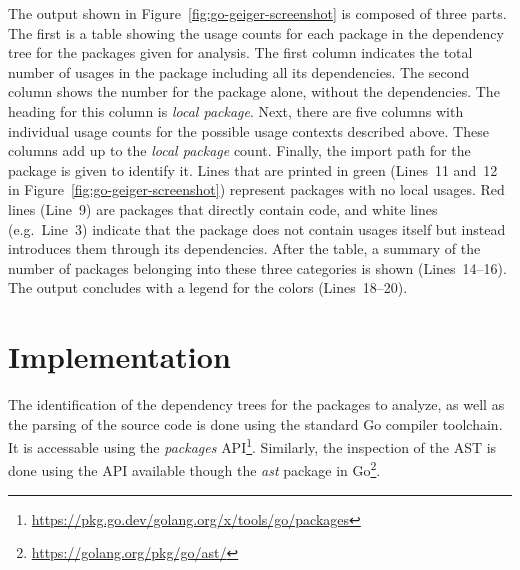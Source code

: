 

The output shown in Figure~\ref{fig:go-geiger-screenshot} is composed of three parts.
The first is a table showing the \unsafe{} usage counts for each package in the dependency tree for the packages
given for analysis.
The first column indicates the total number of usages in the package including all its dependencies.
The second column shows the number for the package alone, without the dependencies.
The heading for this column is \textit{local package}.
Next, there are five columns with individual usage counts for the possible usage contexts described above.
These columns add up to the \textit{local package} count.
Finally, the import path for the package is given to identify it.
Lines that are printed in green (Lines~11 and~12 in Figure~\ref{fig:go-geiger-screenshot}) represent packages with no
local \unsafe{} usages.
Red lines (Line~9) are packages that directly contain \unsafe{} code, and white lines (e.g.~Line~3) indicate that the
package does not contain \unsafe{} usages itself but instead introduces them through its dependencies.
After the table, a summary of the number of packages belonging into these three categories is shown (Lines~14--16).
The output concludes with a legend for the colors (Lines~18--20).



\section{Implementation}\label{sec:go-geiger:implementation}

The identification of the dependency trees for the packages to analyze, as well as the parsing of the source code is
done using the standard Go compiler toolchain.
It is accessable using the \textit{packages}
\acrshort{API}\footnote{\url{https://pkg.go.dev/golang.org/x/tools/go/packages}}.
Similarly, the inspection of the \acrshort{AST} is done using the \acrshort{API} available though the \textit{ast}
package in Go\footnote{\url{https://golang.org/pkg/go/ast/}}.

